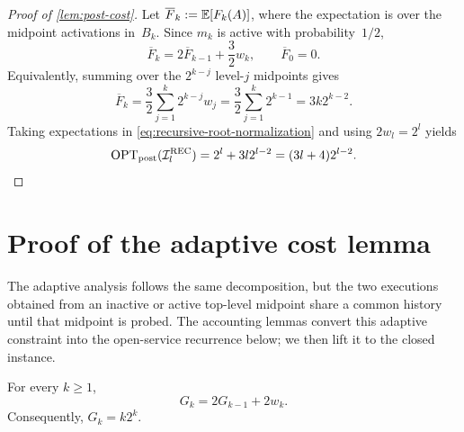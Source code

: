 \documentclass[12pt,a4paper,oneside]{report}
\begin{document}
\begin{proof}[Proof of \cref{lem:post-cost}]
Let $\overline F_k:=\mathbb{E}[F_k(A)]$, where the expectation is over the midpoint
activations in~$B_k$.  Since $m_k$ is active with probability~$1/2$,
\[
    \overline F_k
    =
    2\overline F_{k-1}+\frac32w_k,
    \qquad
    \overline F_0=0.
\]
Equivalently, summing over the $2^{k-j}$ level-$j$ midpoints gives
\begin{equation}\label{eq:expected-open-post}
    \overline F_k
    =
    \frac32\sum_{j=1}^k2^{k-j}w_j
    =
    \frac32\sum_{j=1}^k2^{k-1}
    =
    3k2^{k-2}.
\end{equation}
Taking expectations in \cref{eq:recursive-root-normalization} and using
$2w_l=2^l$ yields
\begin{equation}\label{eq:post-value-recursive}
    \operatorname{OPT}_\mathrm{post}(\mathcal{I}_l^{\mathrm{REC}})
    =
    2^l+3l2^{l-2}
    =
    (3l+4)2^{l-2}.
\end{equation}
\end{proof}

\section{Proof of the adaptive cost lemma}\label{sec:recursive-adaptive-proof}

The adaptive analysis follows the same decomposition, but the two executions
obtained from an inactive or active top-level midpoint share a common history
until that midpoint is probed.  The accounting lemmas convert this adaptive
constraint into the open-service recurrence below; we then lift it to the
closed instance.

\begin{lemma}\label{lem:adapt-rec}
For every $k\ge1$,
\begin{equation}\label{eq:adapt-rec}
    G_k=2G_{k-1}+2w_k.
\end{equation}
Consequently, $G_k=k2^k$.
\end{lemma}
\end{document}
